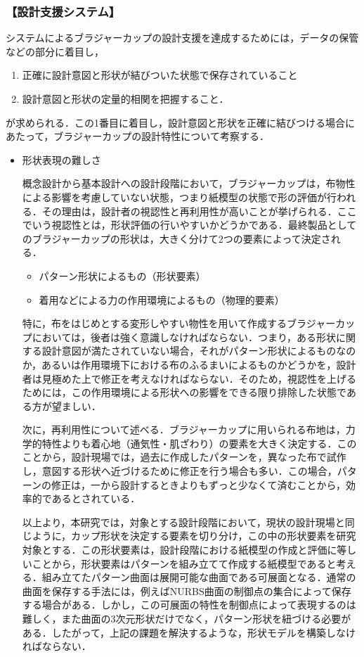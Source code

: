 \documentclass[11pt]{jsarticle}
\begin{document}
		\subsubsection{【設計支援システム】}
			システムによるブラジャーカップの設計支援を達成するためには，データの保管などの部分に着目し，
			\begin{enumerate}
				\item 正確に設計意図と形状が結びついた状態で保存されていること
				\item 設計意図と形状の定量的相関を把握すること．
			\end{enumerate}
			が求められる．この1番目に着目し，設計意図と形状を正確に結びつける場合にあたって，ブラジャーカップの設計特性について考察する．
			\begin{itemize}
				\item 形状表現の難しさ
				
				概念設計から基本設計への設計段階において，ブラジャーカップは，布物性による影響を考慮していない状態，つまり紙模型の状態で形の評価が行われる．その理由は，設計者の視認性と再利用性が高いことが挙げられる．ここでいう視認性とは，形状評価の行いやすいかどうかである．最終製品としてのブラジャーカップの形状は，大きく分けて2つの要素によって決定される．
				\begin{itemize}
					\item パターン形状によるもの（形状要素）
					\item 着用などによる力の作用環境によるもの（物理的要素）
				\end{itemize}
				特に，布をはじめとする変形しやすい物性を用いて作成するブラジャーカップにおいては，後者は強く意識しなければならない．つまり，ある形状に関する設計意図が満たされていない場合，それがパターン形状によるものなのか，あるいは作用環境下における布のふるまいによるものかどうかを，設計者は見極めた上で修正を考えなければならない．そのため，視認性を上げるためには，この作用環境による形状への影響をできる限り排除した状態である方が望ましい．
				
				次に，再利用性について述べる．ブラジャーカップに用いられる布地は，力学的特性よりも着心地（通気性・肌ざわり）の要素を大きく決定する．このことから，設計現場では，過去に作成したパターンを，異なった布で試作し，意図する形状へ近づけるために修正を行う場合も多い．この場合，パターンの修正は，一から設計するときよりもずっと少なくて済むことから，効率的であるとされている．
				
				以上より，本研究では，対象とする設計段階において，現状の設計現場と同じように，カップ形状を決定する要素を切り分け，この中の形状要素を研究対象とする．この形状要素は，設計段階における紙模型の作成と評価に等しいことから，形状要素はパターンを組み立てて作成する紙模型であると考える．組み立てたパターン曲面は展開可能な曲面である可展面となる．通常の曲面を保存する手法には，例えばNURBS曲面の制御点の集合によって保存する場合がある．しかし，この可展面の特性を制御点によって表現するのは難しく，また曲面の3次元形状だけでなく，パターン形状を紐づける必要がある．したがって，上記の課題を解決するような，形状モデルを構築しなければならない．
				

\end{itemize}
\end{document}
